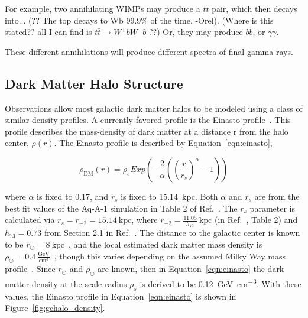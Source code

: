     For example, two annihilating WIMPs may produce a $t\bar{t}$ pair, which then decays into... {\color{red}(?? The top decays to Wb 99.9\% of the time. -Orel)}.
    {\color{red}(Where is this stated?? all I can find is $t\bar{t} \rightarrow W^{+}bW^{-}\bar{b}$ ??)}
    Or, they may produce $b\bar{b}$, or $\gamma\gamma$.

    These different annihilations will produce different spectra of final gamma rays.
  
  \subsection{Dark Matter Halo Structure}\label{dm_spatial}
    Observations allow most galactic dark matter halos to be modeled using a class of similar density profiles.
    A currently favored profile is the Einasto profile~\cite{einastoprofile1,einastoprofile2}.
    This profile describes the mass-density of dark matter at a distance r from the halo center, $\rho(r)$.
    The Einasto profile is described by Equation~\ref{eqn:einasto},

    \begin{equation} \label{eqn:einasto}
      \rho_{\textrm{DM}} \left( r \right) = \rho_{s} Exp \left( - \frac{2}{\alpha} \left( {\left( \frac{r}{r_s} \right)}^{\alpha} - 1 \right) \right)
    \end{equation}
    
    where $\alpha$ is fixed to 0.17, and $r_s$ is fixed to \SI{15.14}{kpc}.
    Both $\alpha$ and $r_s$ are from the best fit values of the Aq-A-1 simulation in Table 2 of Ref.~\cite{mw_halo_params}.
    The $r_s$ parameter is calculated via $r_s=r_{-2}=15.14\:\textrm{kpc}$, where $r_{-2}=\frac{11.05}{h_{73}}\:\textrm{kpc}$ (in Ref.~\cite{mw_halo_params}, Table 2) and $h_{73}=0.73$ from Section 2.1 in Ref.~\cite{mw_halo_params}.
    The distance to the galactic center is known to be $r_\odot=8\:\textrm{kpc}$~\cite{gc_distance_1,gc_distance_2,gc_distance_3}, and the local estimated dark matter mass density is $\rho_\odot = 0.4\:\frac{\textrm{GeV}}{\textrm{cm}^3}$~\cite{local_dm_density}, though this varies depending on the assumed Milky Way mass profile~\cite{direct_dm_astrophysical_uncertainties}.
    Since $r_\odot$ and $\rho_\odot$ are known, then in Equation~\ref{eqn:einasto} the dark matter density at the scale radius $\rho_s$ is derived to be \SI{0.12}{\GeV\per\cm^3}.
    With these values, the Einasto profile in Equation~\ref{eqn:einasto} is shown in Figure~\ref{fig:gchalo_density}.
  
